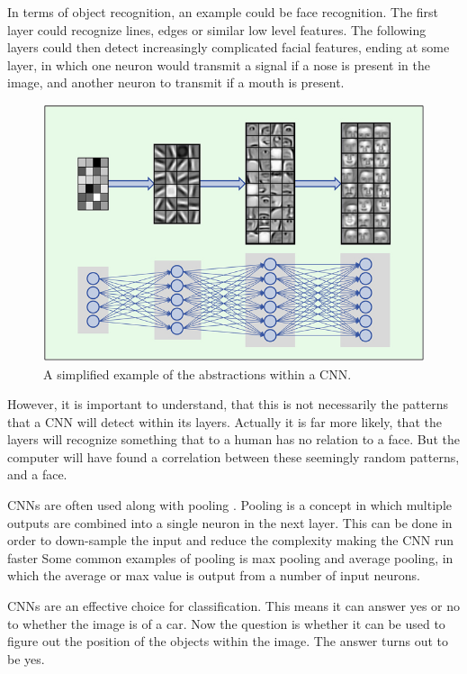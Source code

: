 In terms of object recognition, an example could be face recognition.
The first layer could recognize lines, edges or similar low level features.
The following layers could then detect increasingly complicated facial features, ending at some layer, in which one neuron would transmit a signal if a nose is present in the image, and another neuron to transmit if a mouth is present.


\begin{figure}[H]
	\centering
	\includegraphics[scale=0.40]{images/cnn_face.jpg}
	\caption{
		A simplified example of the abstractions within a CNN.
	}
	\label{fig:face_cnn}
\end{figure}
 
However, it is important to understand, that this is not necessarily the patterns that a CNN will detect within its layers.
Actually it is far more likely, that the layers will recognize something that to a human has no relation to a face.
But the computer will have found a correlation between these seemingly random patterns, and a face.

CNNs are often used along with pooling \cite{CNN}.
Pooling is a concept in which multiple outputs are combined into a single neuron in the next layer.
This can be done in order to down-sample the input and reduce the complexity making the CNN run faster
Some common examples of pooling is max pooling and average pooling, in which the average or max value is output from a number of input neurons.

CNNs are an effective choice for classification. 
This means it can answer yes or no to whether the image is of a car.
Now the question is whether it can be used to figure out the position of the objects within the image.
The answer turns out to be yes.


